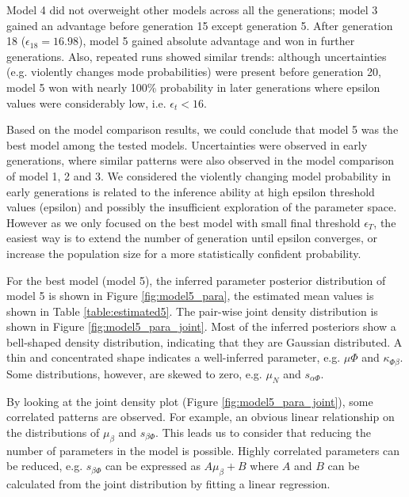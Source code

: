 Model 4 did not overweight other models across all the generations; model 3 gained an advantage before generation 15 except generation 5. After generation 18 ($\epsilon_{18} = 16.98$), model 5 gained absolute advantage and won in further generations. Also, repeated runs showed similar trends: although uncertainties (e.g. violently changes mode probabilities) were present before generation 20, model 5 won with nearly 100\% probability in later generations where epsilon values were considerably low, i.e. $\epsilon_t<16$.

Based on the model comparison results, we could conclude that model 5 was the best model among the tested models. Uncertainties were observed in early generations, where similar patterns were also observed in the model comparison of model 1, 2 and 3. We considered the violently changing model probability in early generations is related to the inference ability at high epsilon threshold values (epsilon) and possibly the insufficient exploration of the parameter space. However as we only focused on the best model with small final threshold $\epsilon_T$, the easiest way is to extend the number of generation until epsilon converges, or increase the population size for a more statistically confident probability.




For the best model (model 5), the inferred parameter posterior distribution of model 5 is shown in Figure \ref{fig:model5_para}, the estimated mean values is shown in Table \ref{table:estimated5}. The pair-wise joint density distribution is shown in Figure \ref{fig:model5_para_joint}. Most of the inferred posteriors show a bell-shaped density distribution, indicating that they are Gaussian distributed. A thin and concentrated shape indicates a well-inferred parameter, e.g. $\mu{\Phi}$ and $\kappa_{\Phi\beta}$. Some distributions, however, are skewed to zero, e.g. $\mu_N$ and $s_{\alpha\Phi}$.

By looking at the joint density plot (Figure \ref{fig:model5_para_joint}), some correlated patterns are observed. For example, an obvious linear relationship on the distributions of $\mu_\beta$ and $s_{\beta\Phi}$. This leads us to consider that reducing the number of parameters in the model is possible. Highly correlated parameters can be reduced, e.g. $s_{\beta\Phi}$ can be expressed as $A\mu_\beta+B$ where $A$ and $B$ can be calculated from the joint distribution by fitting a linear regression.

